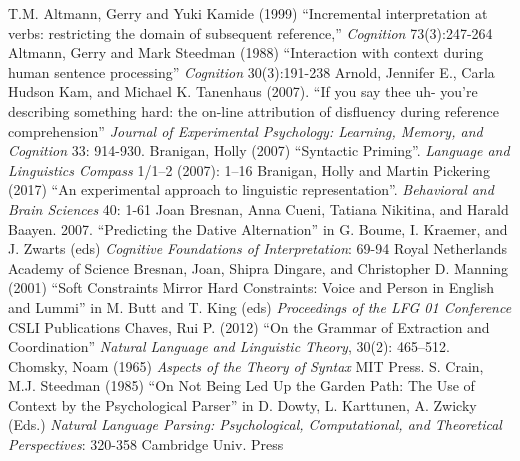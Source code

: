 \documentclass[a4paper]{article}
\begin{document}
T.M. Altmann, Gerry and Yuki Kamide (1999)
``Incremental interpretation at verbs: restricting the domain of subsequent reference,''
{\it Cognition} 73(3):247-264
\newline
\newline
 Altmann, Gerry  and Mark Steedman (1988) ``Interaction with context during human sentence processing'' 
{\it Cognition} 30(3):191-238
\newline
\newline
Arnold, Jennifer E., Carla Hudson Kam, and Michael K. Tanenhaus (2007). ``If you say thee uh- you’re describing something hard: the on-line attribution of disfluency during reference comprehension'' {\it Journal of Experimental Psychology: Learning, Memory, and Cognition} 33: 914-930.
\newline
\newline
Branigan, Holly (2007) ``Syntactic Priming''.  {\it Language and Linguistics Compass} 1/1–2 (2007): 1–16
\newline
\newline
Branigan, Holly and Martin Pickering (2017) ``An experimental approach to
linguistic representation''.  {\it Behavioral and Brain Sciences} 40: 1-61
\newline
\newline
Joan Bresnan, Anna Cueni, Tatiana Nikitina, and Harald Baayen. 2007. ``Predicting the Dative Alternation'' in  G. Boume, I. Kraemer, and J. Zwarts (eds) {\it Cognitive Foundations of Interpretation}: 69-94  Royal Netherlands Academy of Science
\newline
\newline
Bresnan, Joan, Shipra Dingare, and Christopher D. Manning (2001) ``Soft Constraints Mirror Hard
Constraints: Voice and Person in English and
Lummi'' in M. Butt and T. King (eds) {\it Proceedings of the LFG 01
Conference}
CSLI
Publications
\newline
\newline
Chaves, Rui P. (2012) ``On the Grammar of Extraction and Coordination'' {\it Natural Language and Linguistic Theory}, 30(2): 465–512.
\newline
\newline
Chomsky, Noam (1965) {\it Aspects of the Theory of Syntax}  MIT Press.
\newline
\newline
S. Crain, M.J. Steedman (1985)
``On Not Being Led Up the Garden Path: The Use of Context by the Psychological Parser'' in
D. Dowty, L. Karttunen, A. Zwicky (Eds.) {\it Natural Language Parsing: Psychological, Computational, and Theoretical Perspectives}: 320-358 Cambridge Univ. Press
\end{document}
